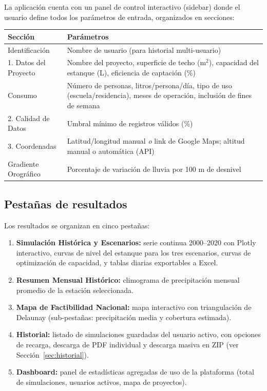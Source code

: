 \documentclass[12pt, a4paper]{article}
\begin{document}
La aplicación cuenta con un panel de control interactivo (sidebar) donde el usuario define todos los parámetros de entrada, organizados en secciones:

\begin{center}
\begin{tabular}{lp{9cm}}
\toprule
\textbf{Sección} & \textbf{Parámetros} \\
\midrule
Identificación & Nombre de usuario (para historial multi-usuario) \\
1. Datos del Proyecto & Nombre del proyecto, superficie de techo (m$^2$), capacidad del estanque (L), eficiencia de captación (\%) \\
Consumo & Número de personas, litros/persona/día, tipo de uso (escuela/residencia), meses de operación, inclusión de fines de semana \\
2. Calidad de Datos & Umbral mínimo de registros válidos (\%) \\
3. Coordenadas & Latitud/longitud manual \textit{o} link de Google Maps; altitud manual o automática (API) \\
Gradiente Orográfico & Porcentaje de variación de lluvia por 100 m de desnivel \\
\bottomrule
\end{tabular}
\end{center}

\subsection{Pestañas de resultados}

Los resultados se organizan en cinco pestañas:

\begin{enumerate}
    \item \textbf{Simulación Histórica y Escenarios:} serie continua 2000--2020 con Plotly interactivo, curvas de nivel del estanque para los tres escenarios, curvas de optimización de capacidad, y tablas diarias exportables a Excel.
    \item \textbf{Resumen Mensual Histórico:} climograma de precipitación mensual promedio de la estación seleccionada.
    \item \textbf{Mapa de Factibilidad Nacional:} mapa interactivo con triangulación de Delaunay (sub-pestañas: precipitación media y cobertura estimada).
    \item \textbf{Historial:} listado de simulaciones guardadas del usuario activo, con opciones de recarga, descarga de PDF individual y descarga masiva en ZIP (ver Sección~\ref{sec:historial}).
    \item \textbf{Dashboard:} panel de estadísticas agregadas de uso de la plataforma (total de simulaciones, usuarios activos, mapa de proyectos).
\end{enumerate}
\end{document}
